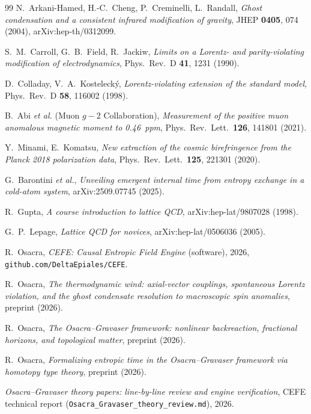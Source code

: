 \documentclass[11pt,a4paper]{article}
\theoremstyle{definition}
\theoremstyle{remark}
\begin{document}
\begin{thebibliography}{99}
 N.~Arkani-Hamed, H.-C.~Cheng, P.~Creminelli,
L.~Randall, \textit{Ghost condensation and a consistent infrared
modification of gravity}, JHEP \textbf{0405}, 074 (2004),
arXiv:hep-th/0312099.

 S.~M.~Carroll, G.~B.~Field, R.~Jackiw,
\textit{Limits on a Lorentz- and parity-violating modification of
electrodynamics}, Phys.\ Rev.\ D \textbf{41}, 1231 (1990).

 D.~Colladay, V.~A.~Kosteleck\'y,
\textit{Lorentz-violating extension of the standard model}, Phys.\ Rev.\ D
\textbf{58}, 116002 (1998).

 B.~Abi \textit{et al.} (Muon $g-2$ Collaboration),
\textit{Measurement of the positive muon anomalous magnetic moment to
0.46~ppm}, Phys.\ Rev.\ Lett.\ \textbf{126}, 141801 (2021).

 Y.~Minami, E.~Komatsu,
\textit{New extraction of the cosmic birefringence from the Planck 2018
polarization data}, Phys.\ Rev.\ Lett.\ \textbf{125}, 221301 (2020).

 G.~Barontini \textit{et al.},
\textit{Unveiling emergent internal time from entropy exchange in a
cold-atom system}, arXiv:2509.07745 (2025).

 R.~Gupta,
\textit{A course introduction to lattice QCD}, arXiv:hep-lat/9807028 (1998).

 G.~P.~Lepage,
\textit{Lattice QCD for novices}, arXiv:hep-lat/0506036 (2005).

 R.~Osacra,
\textit{CEFE: Causal Entropic Field Engine} (software), 2026,
\texttt{github.com/DeltaEpiales/CEFE}.

 R.~Osacra,
\textit{The thermodynamic wind: axial-vector couplings, spontaneous Lorentz
violation, and the ghost condensate resolution to macroscopic spin
anomalies}, preprint (2026).

 R.~Osacra,
\textit{The Osacra--Gravaser framework: nonlinear backreaction, fractional
horizons, and topological matter}, preprint (2026).

 R.~Osacra,
\textit{Formalizing entropic time in the Osacra--Gravaser framework via
homotopy type theory}, preprint (2026).

 \textit{Osacra--Gravaser theory papers: line-by-line
review and engine verification}, CEFE technical report
(\texttt{Osacra\_Gravaser\_theory\_review.md}), 2026.

\end{thebibliography}
\end{document}
